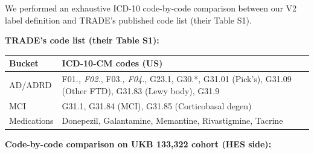 \documentclass[
  11pt,
]{article}
\newcounter{none} %
\begin{document}
We performed an exhaustive ICD-10 code-by-code comparison between our V2
label definition and TRADE's published code list (their Table S1).

\textbf{TRADE's code list (their Table S1):}

{\def\LTcaptype{none} %
\begin{longtable}[]{|>{\raggedright\arraybackslash}p{}|>{\raggedright\arraybackslash}p{}|}
\hline
\begin{minipage}[b]{\linewidth}\raggedright
Bucket
\end{minipage} & \begin{minipage}[b]{\linewidth}\raggedright
ICD-10-CM codes (US)
\end{minipage} \\
\hline
\hline
\endhead
\hline
\endlastfoot
AD/ADRD & F01.\emph{, F02.}, F03.\emph{, F04.}, G23.1, G30.*, G31.01
(Pick's), G31.09 (Other FTD), G31.83 (Lewy body), G31.9 \\
\hline
MCI & G31.1, G31.84 (MCI), G31.85 (Corticobasal degen) \\
\hline
Medications & Donepezil, Galantamine, Memantine, Rivastigmine,
Tacrine \\
\hline
\end{longtable}
}

\textbf{Code-by-code comparison on UKB 133,322 cohort (HES side):}
\end{document}
